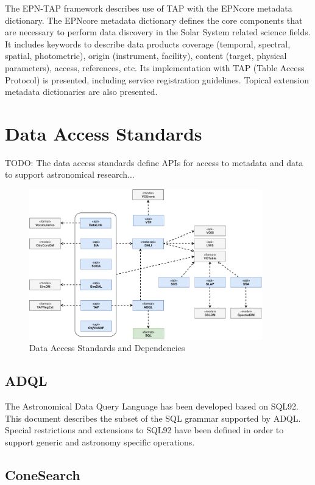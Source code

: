 \documentclass[11pt,a4paper]{ivoa}
\begin{document}
The EPN-TAP framework describes use of TAP with the EPNcore metadata dictionary. The EPNcore 
metadata dictionary defines the core components that are necessary to perform data discovery 
in the Solar System related science fields. It includes keywords to describe data products 
coverage (temporal, spectral, spatial, photometric), origin (instrument, facility), content 
(target, physical parameters), access, references, etc. Its implementation with TAP (Table 
Access Protocol) is presented, including service registration guidelines. Topical extension 
metadata dictionaries are also presented. 

\section{Data Access Standards}

TODO: The data access standards define APIs for access to metadata and data to support 
astronomical research...

\begin{figure}[h]
\centering
\includegraphics[width=0.90\textwidth]{ivoa-arch-dal.pdf}
\caption{Data Access Standards and Dependencies}
\label{fig:daldeps}
\end{figure}

\subsection{ADQL}

The Astronomical Data Query Language has been developed based on SQL92. This document 
describes the subset of the SQL grammar supported by ADQL. Special restrictions and 
extensions to SQL92 have been defined in order to support generic and astronomy 
specific operations. 

\subsection{ConeSearch}
\end{document}
